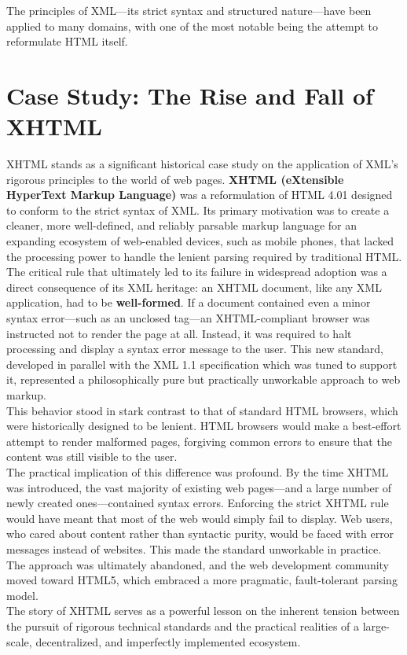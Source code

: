 \documentclass{scrbook}
\begin{document}
The principles of XML—its strict syntax and structured nature—have been applied to many domains, with one of the most notable being the attempt to reformulate HTML itself.

\chapter{Case Study: The Rise and Fall of XHTML}

XHTML stands as a significant historical case study on the application of XML's rigorous principles to the world of web pages. \textbf{XHTML (eXtensible HyperText Markup Language)} was a reformulation of HTML 4.01 designed to conform to the strict syntax of XML. Its primary motivation was to create a cleaner, more well-defined, and reliably parsable markup language for an expanding ecosystem of web-enabled devices, such as mobile phones, that lacked the processing power to handle the lenient parsing required by traditional HTML. \\

The critical rule that ultimately led to its failure in widespread adoption was a direct consequence of its XML heritage: an XHTML document, like any XML application, had to be \textbf{well-formed}. If a document contained even a minor syntax error—such as an unclosed tag—an XHTML-compliant browser was instructed not to render the page at all. Instead, it was required to halt processing and display a syntax error message to the user. This new standard, developed in parallel with the XML 1.1 specification which was tuned to support it, represented a philosophically pure but practically unworkable approach to web markup. \\

This behavior stood in stark contrast to that of standard HTML browsers, which were historically designed to be lenient. HTML browsers would make a best-effort attempt to render malformed pages, forgiving common errors to ensure that the content was still visible to the user. \\

The practical implication of this difference was profound. By the time XHTML was introduced, the vast majority of existing web pages—and a large number of newly created ones—contained syntax errors. Enforcing the strict XHTML rule would have meant that most of the web would simply fail to display. Web users, who cared about content rather than syntactic purity, would be faced with error messages instead of websites. This made the standard unworkable in practice. The approach was ultimately abandoned, and the web development community moved toward HTML5, which embraced a more pragmatic, fault-tolerant parsing model. \\

The story of XHTML serves as a powerful lesson on the inherent tension between the pursuit of rigorous technical standards and the practical realities of a large-scale, decentralized, and imperfectly implemented ecosystem.
\end{document}
